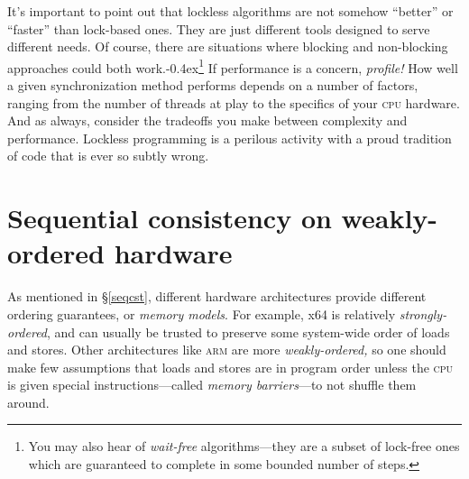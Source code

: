 \documentclass[fontsize=10pt, numbers=endperiod]{scrartcl}
\newcommand{\punckern}{\kern-0.4ex}
\newcommand{\introduce}[1]{\textit{#1}}
\newcommand{\secref}[1]{\hyperref[#1]{\textsc{\S}\ref*{#1}}}
\begin{document}
\begin{multicols*}{2}
It's important to point out that lockless algorithms are not somehow ``better''
or ``faster'' than lock-based ones.
They are just different tools designed to serve different needs.
Of course, there are situations where blocking
and non-blocking approaches could both work.\punckern\footnote{You
may also hear of \introduce{wait-free} algorithms---they are a subset of
lock-free ones which are guaranteed to complete in some
bounded number of steps.}
If performance is a concern, \emph{profile!}
How well a given synchronization method performs depends on a number of factors,
ranging from the number of threads at
play to the specifics of your \textsc{cpu} hardware.
And as always, consider the tradeoffs you make between
complexity and performance.
Lockless programming is a perilous activity
with a proud tradition of code that is ever so subtly wrong.

\section{Sequential consistency on weakly-ordered hardware}

As mentioned in \secref{seqcst}, different hardware architectures
provide different ordering guarantees, or \introduce{memory models}.
For example, x64 is relatively \introduce{strongly-ordered},
and can usually be trusted to preserve some system-wide order of
loads and stores.
Other architectures like \textsc{arm} are more \introduce{weakly-ordered,}
so one should make few assumptions that loads and stores are in
program order unless the \textsc{cpu} is given special instructions---called
\introduce{memory barriers}---to not shuffle them around.


\end{multicols*}
\end{document}

